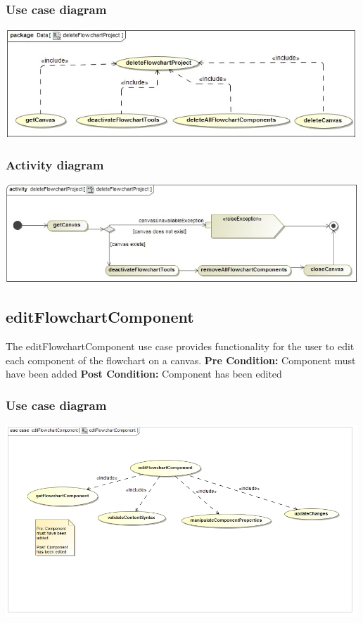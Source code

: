 \documentclass[11pt,a4paper,titlepage]{article}
\begin{document}
\subsubsection{Use case diagram}
\includegraphics[width=500px]{deleteFlowchartProjectUseCase.jpg}

\subsubsection{Activity diagram}
\includegraphics[width=500px]{deleteFlowchartProject.jpg}

\subsection{editFlowchartComponent}
The editFlowchartComponent use case provides functionality for the user to edit each component of the flowchart on a canvas.\newline\newline
\textbf{Pre Condition:} Component must have been added\newline\newline
\textbf{Post Condition:} Component has been edited

\subsubsection{Use case diagram}
\includegraphics[width=500px]{editFlowchartComponentUseCase.jpg}
\end{document}
